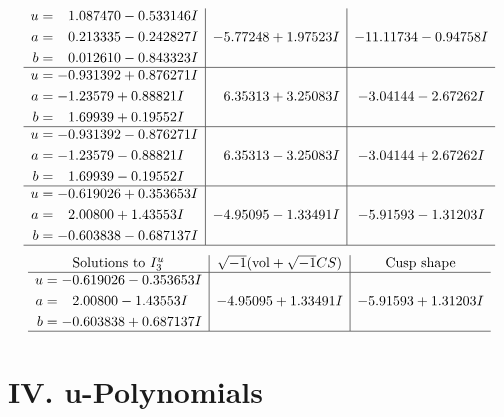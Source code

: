 \documentclass[1p]{elsarticle_modified}
\theoremstyle{definition}
\newcommand{\I}{\sqrt{-1}}
\begin{document}
$$\begin{array}{c|c|c}
\begin{aligned}
u &= \phantom{-}1.087470 - 0.533146 I \\
a &= \phantom{-}0.213335 - 0.242827 I \\
b &= \phantom{-}0.012610 - 0.843323 I\end{aligned}
 & -5.77248 + 1.97523 I & -11.11734 - 0.94758 I \\ \hline\begin{aligned}
u &= -0.931392 + 0.876271 I \\
a &= -1.23579 + 0.88821 I \\
b &= \phantom{-}1.69939 + 0.19552 I\end{aligned}
 & \phantom{-}6.35313 + 3.25083 I & -3.04144 - 2.67262 I \\ \hline\begin{aligned}
u &= -0.931392 - 0.876271 I \\
a &= -1.23579 - 0.88821 I \\
b &= \phantom{-}1.69939 - 0.19552 I\end{aligned}
 & \phantom{-}6.35313 - 3.25083 I & -3.04144 + 2.67262 I \\ \hline\begin{aligned}
u &= -0.619026 + 0.353653 I \\
a &= \phantom{-}2.00800 + 1.43553 I \\
b &= -0.603838 - 0.687137 I\end{aligned}
 & -4.95095 - 1.33491 I & -5.91593 - 1.31203 I\\
 \hline 
 \end{array}$$\newpage$$\begin{array}{c|c|c}  
\text{Solutions to }I^u_{3}& \I (\text{vol} + \sqrt{-1}CS) & \text{Cusp shape}\\
 \hline 
\begin{aligned}
u &= -0.619026 - 0.353653 I \\
a &= \phantom{-}2.00800 - 1.43553 I \\
b &= -0.603838 + 0.687137 I\end{aligned}
 & -4.95095 + 1.33491 I & -5.91593 + 1.31203 I\\
 \hline 
 \end{array}$$\newpage
\newpage\renewcommand{\arraystretch}{1}
\centering \section*{ IV. u-Polynomials}
\end{document}
